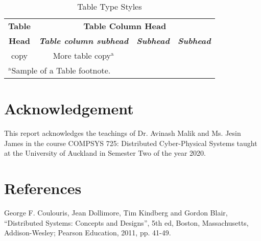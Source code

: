 \documentclass[conference]{IEEEtran}
\begin{document}
\begin{table}[htbp]
\caption{Table Type Styles}
\begin{center}
\begin{tabular}{|c|c|c|c|}
\hline
\textbf{Table}&\multicolumn{3}{|c|}{\textbf{Table Column Head}} \\
\cline{2-4} 
\textbf{Head} & \textbf{\textit{Table column subhead}}& \textbf{\textit{Subhead}}& \textbf{\textit{Subhead}} \\
\hline
copy& More table copy$^{\mathrm{a}}$& &  \\
\hline
\multicolumn{4}{l}{$^{\mathrm{a}}$Sample of a Table footnote.}
\end{tabular}
\label{tab1}
\end{center}
\end{table}


\section*{Acknowledgement}
This report acknowledges the teachings of Dr. Avinash Malik and Ms. Jesin James
in the course COMPSYS 725: Distributed Cyber-Physical Systems taught at the
University of Auckland in Semester Two of the year 2020.

\section*{References}
\begin{thebibliography}{00}
 George F. Coulouris, Jean Dollimore, Tim Kindberg and Gordon
  Blair, ``Distributed Systems: Concepts and Designs'', 5th ed, Boston,
    Massachusetts, Addison-Wesley; Pearson Education, 2011, pp. 41-49.
\end{thebibliography}
\vspace{12pt}
\end{document}
